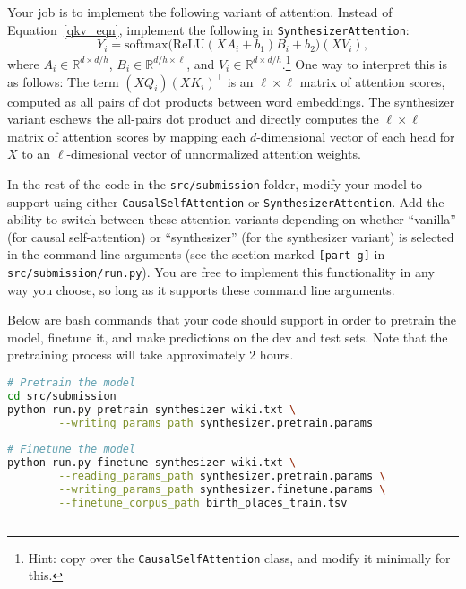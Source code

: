 \begin{enumerate}[(a)]
Your job is to implement the following variant of attention. Instead of Equation~\ref{qkv_eqn}, implement the following in \texttt{SynthesizerAttention}:
\begin{equation} 
Y_i = \text{softmax}\big(\text{ReLU}(XA_i+b_1)B_i + b_2 \big)(XV_i),
\end{equation}
where $A_i\in\mathbb{R}^{d \times d/h}$, $B_i\in\mathbb{R}^{d/h\times \ell}$, and $V_i\in\mathbb{R}^{d\times d/h}$.\footnote{Hint: copy over the \texttt{CausalSelfAttention} class, and modify it minimally for this.}
One way to interpret this is as follows: The term $(XQ_i)(XK_i)^\top$ is an $\ell \times \ell$ matrix of attention scores, computed as all pairs of dot products between word embeddings.
The synthesizer variant eschews the all-pairs dot product and directly computes the $\ell \times \ell$ matrix of attention scores by mapping each $d$-dimensional vector of each head for $X$ to an $\ell$-dimesional vector of unnormalized attention weights.

In the rest of the code in the \texttt{src/submission} folder, modify your model to support using either \texttt{CausalSelfAttention} or \texttt{SynthesizerAttention}. Add the ability to switch between these attention variants depending on whether ``vanilla'' (for causal self-attention) or ``synthesizer'' (for the synthesizer variant) is selected in the command line arguments (see the section marked \texttt{[part g]} in \texttt{src/submission/run.py}). 
You are free to implement this functionality in any way you choose, so long as it supports these command line arguments.

Below are bash commands that your code should support in order to pretrain the model, finetune it, and make predictions on the dev and test sets.
Note that the pretraining process will take approximately 2 hours.
\begin{lstlisting}[language=bash]
# Pretrain the model
cd src/submission
python run.py pretrain synthesizer wiki.txt \
        --writing_params_path synthesizer.pretrain.params
        
# Finetune the model
python run.py finetune synthesizer wiki.txt \
        --reading_params_path synthesizer.pretrain.params \
        --writing_params_path synthesizer.finetune.params \
        --finetune_corpus_path birth_places_train.tsv
        

\end{lstlisting}
\end{enumerate}
